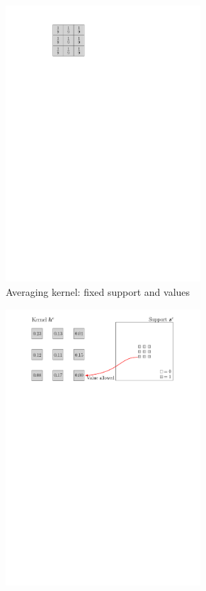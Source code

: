 \begin{figure}[!ht]\centering
\begin{subfigure}[b]{0.20\textwidth}\centering
\includegraphics[width=0.80\textwidth]{figures/kernel-exple.pdf}
\caption{Averaging kernel: fixed support and values}\label{fig_example_kernel}
\end{subfigure}
\begin{subfigure}[b]{0.79\textwidth}\centering
\includegraphics[width=0.80\textwidth]{figures/kernel-h_e.pdf}

\end{subfigure}
\end{figure}

